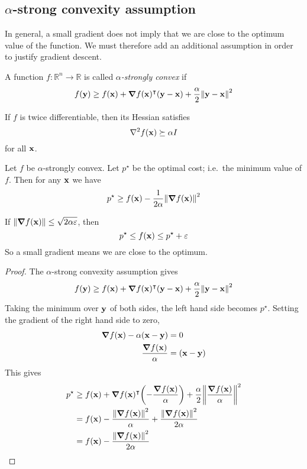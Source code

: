 \subsection{\(\alpha\)-strong convexity assumption}
In general, a small gradient does not imply that we are close to the optimum value of the function.
We must therefore add an additional assumption in order to justify gradient descent.
\begin{definition}
	A function \(f \colon \mathbb R^n \to \mathbb R\) is called \textit{\(\alpha\)-strongly convex} if
	\[
		f(\vb y) \geq f(\vb x) + \grad{f(\vb x)}^\intercal (\vb y - \vb x) + \frac{\alpha}{2}\norm{\vb y - \vb x}^2
	\]
\end{definition}
\noindent If \(f\) is twice differentiable, then its Hessian satisfies
\[
	\laplacian{f(\vb x)} \succeq \alpha I
\]
for all \(\vb x\).
\begin{claim}
	Let \(f\) be \(\alpha\)-strongly convex.
	Let \(p^\star\) be the optimal cost; i.e.\ the minimum value of \(f\).
	Then for any \(\vb x\) we have
	\[
		p^\star \geq f(\vb x) - \frac{1}{2\alpha}\norm{\grad{f(\vb x)}}^2
	\]
\end{claim}
\begin{remark}
	If \(\norm{\grad{f(\vb x)}} \leq \sqrt{2\alpha\varepsilon}\), then
	\[
		p^\star \leq f(\vb x) \leq p^\star + \varepsilon
	\]
	So a small gradient means we are close to the optimum.
\end{remark}
\begin{proof}
	The \(\alpha\)-strong convexity assumption gives
	\[
		f(\vb y) \geq f(\vb x) + \grad{f(\vb x)}^\intercal (\vb y - \vb x) + \frac{\alpha}{2}\norm{\vb y - \vb x}^2
	\]
	Taking the minimum over \(\vb y\) of both sides, the left hand side becomes \(p^\star\).
	Setting the gradient of the right hand side to zero,
	\begin{align*}
		\grad{f(\vb x)} - \alpha (\vb x - \vb y) & = 0               \\
		\frac{\grad{f(\vb x)}}{\alpha}           & = (\vb x - \vb y) \\
	\end{align*}
	This gives
	\begin{align*}
		p^\star & \geq f(\vb x) + \grad{f(\vb x)}^\intercal \qty(-\frac{\grad{f(\vb x)}}{\alpha}) + \frac{\alpha}{2}\norm{\frac{\grad{f(\vb x)}}{\alpha}}^2 \\
		        & = f(\vb x) - \frac{\norm{\grad{f(\vb x)}}^2}{\alpha} + \frac{\norm{\grad{f(\vb x)}}^2}{2\alpha}                                            \\
		        & = f(\vb x) - \frac{\norm{\grad{f(\vb x)}}^2}{2\alpha}
	\end{align*}
\end{proof}
